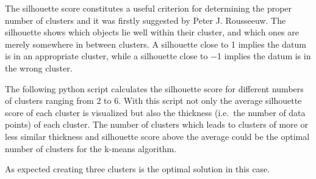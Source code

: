 \documentclass[11pt]{article}
\begin{document}
The silhouette score constitutes a useful criterion for determining the proper number of clusters and it was firstly suggested by Peter J. Rousseeuw. The silhouette shows which objects lie well within their cluster, and which ones are merely somewhere in between clusters. A silhouette close to 1 implies the datum is in an appropriate cluster, while a silhouette close to −1 implies the datum is in the wrong cluster. \par 
The following python script calculates the silhouette score for different numbers of clusters ranging from 2 to 6. With this script not only the average silhouette score of each cluster is visualized but also the thickness (i.e.~the number of data points) of each cluster. The number of clusters which leads to clusters of more or less similar thickness and silhouette score above the average could be the optimal number of clusters for the k-means algorithm. \par
As expected creating three clusters is the optimal solution in this case.
\end{document}
